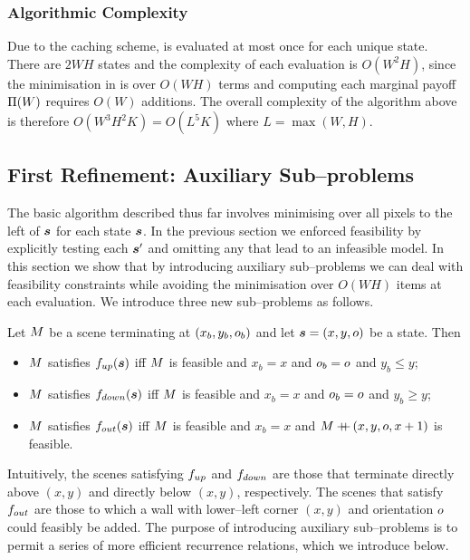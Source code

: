 \subsubsection{Algorithmic Complexity}
Due to the caching scheme,  is evaluated at
most once for each unique state. There are $2WH$ states and the
complexity of each evaluation is $O(W^2H)$, since the minimisation in
 is over $O(WH)$ terms and computing each
marginal payoff $\ScenePayoff(\Wall)$ requires $O(W)$ additions. The
overall complexity of the algorithm above is therefore $O(W^3H^2K) =
O(L^5K)$ where $L=\max(W,H)$.

\subsection{First Refinement: Auxiliary Sub--problems}

The basic algorithm described thus far involves minimising over all
pixels to the left of $\State$ for each state $\State$. In the
previous section we enforced feasibility by explicitly testing each
$\State'$ and omitting any that lead to an infeasible model. In this
section we show that by introducing auxiliary sub--problems we can
deal with feasibility constraints while avoiding the minimisation over
$O(WH)$ items at each evaluation. We introduce three new
sub--problems as follows.
\begin{definition}
  \label{def:aux-sub-problems}
  Let $\Scene$ be a scene terminating at $(x_b,y_b,\WallOrient_b)$ and
  let $\State=(x,y,\WallOrient)$ be a state. Then
  \begin{itemize}
    \item{$\Scene$ satisfies $\SubProbUP(\State)$ iff $\Scene$
      is feasible and $x_b=x$ and $\WallOrient_b=\WallOrient$ and $y_b \leq y$;}
    \item{$\Scene$ satisfies $\SubProbDOWN(\State)$ iff
      $\Scene$ is feasible and $x_b=x$ and $\WallOrient_b=\WallOrient$ and $y_b \geq y$;}
    \item{$\Scene$ satisfies $\SubProbOUT(\State)$ iff
      $\Scene$ is feasible and $x_b=x$ and $\Scene\concat(x,y,\WallOrient,x+1)$ is
      feasible.}
  \end{itemize}
\end{definition}

Intuitively, the scenes satisfying $\SubProbUP$ and $\SubProbDOWN$ are
those that terminate directly above $(x,y)$ and directly below
$(x,y)$, respectively. The scenes that satisfy $\SubProbOUT$ are those
to which a wall with lower--left corner $(x,y)$ and orientation
$\WallOrient$ could feasibly be added. The purpose of introducing
auxiliary sub--problems is to permit a series of more efficient
recurrence relations, which we introduce below.

